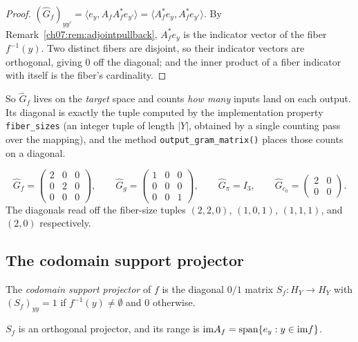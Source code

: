 \begin{proof}
$(\widehat{G}_f)_{y y'}=\langle e_y, A_fA_f^* e_{y'}\rangle
=\langle A_f^* e_y, A_f^* e_{y'}\rangle$. By
Remark~\ref{ch07:rem:adjointpullback}, $A_f^*e_y$ is the indicator vector of
the fiber $f^{-1}(y)$. Two distinct fibers are disjoint, so their indicator
vectors are orthogonal, giving $0$ off the diagonal; and the inner product of
a fiber indicator with itself is the fiber's cardinality.
\end{proof}

So $\widehat{G}_f$ lives on the \emph{target} space and counts \emph{how
many} inputs land on each output. Its diagonal is exactly the tuple computed
by the implementation property \texttt{fiber\_sizes} (an integer tuple of
length $|Y|$, obtained by a single counting pass over the mapping), and the
method \texttt{output\_gram\_matrix()} places those counts on a diagonal.

\begin{example}\label{ch07:ex:outputquartet}
\[
\widehat{G}_f=\begin{pmatrix}2&0&0\\0&2&0\\0&0&0\end{pmatrix},\qquad
\widehat{G}_g=\begin{pmatrix}1&0&0\\0&0&0\\0&0&1\end{pmatrix},\qquad
\widehat{G}_\pi=I_3,\qquad
\widehat{G}_{c_0}=\begin{pmatrix}2&0\\0&0\end{pmatrix}.
\]
The diagonals read off the fiber-size tuples $(2,2,0)$, $(1,0,1)$,
$(1,1,1)$, and $(2,0)$ respectively.
\end{example}

\subsection{The codomain support projector}

\begin{definition}\label{ch07:def:support}
The \emph{codomain support projector} of $f$ is the diagonal $0/1$ matrix
$S_f:H_Y\to H_Y$ with
$(S_f)_{yy}=1$ if $f^{-1}(y)\neq\emptyset$ and $0$ otherwise.
\end{definition}

\begin{proposition}\label{ch07:prop:supportisproj}
$S_f$ is an orthogonal projector, and its range is
$\mathrm{im} A_f=\operatorname{span}\{e_y : y\in\mathrm{im} f\}$.
\end{proposition}

